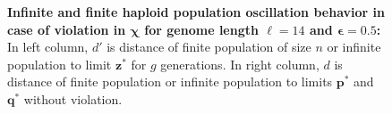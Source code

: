 \begin{figure}[h]
\begin{center}
\hspace{-3em}%
\vspace{-0.5em} \hspace{-3em}%

\caption{\textbf{Infinite and finite haploid population oscillation behavior in case of violation in $\bm{\chi}$ for genome length $\ell = 14$ and $\bm{\epsilon} = 0.5$:} 
  In left column, $d'$ is distance of finite population of size $n$ or infinite population to limit $\bm{z}^\ast$ for $g$ generations. In right column, $d$ is distance of finite population or infinite population to limits $\bm{p}^\ast$ and $\bm{q}^\ast$ without violation.}
\label{oscillation_14h_vio_chi_0.5}
\end{center}
\end{figure}

